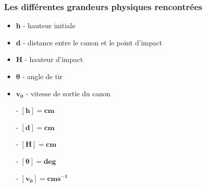 \documentclass[12pt,a4paper]{article}
\begin{document}
    \subsubsection{Les différentes grandeurs physiques rencontrées}
    \begin{minipage}{0.6\linewidth}
        \begin{itemize}
            \item \textbf{h} - hauteur initiale 
            \item \textbf{d} - distance entre le canon et le point d'impact 
            \item \textbf{H} - hauteur d'impact
            \item $\bm{\theta}$ - angle de tir 
            \item $\bm{v_0}$ - vitesse de sortie du canon
        \end{itemize}
    \end{minipage}%
    \hfill
    \begin{minipage}{0.4\linewidth}
        \begin{itemize}
            \item[-] $\bm{[h]=cm}$
            \item[-] $\bm{[d]=cm}$
            \item[-] $\bm{[H]=cm}$
            \item[-] $\bm{[\theta]=deg}$
            \item[-] $\bm{[v_0]=cms^{-1}}$
        \end{itemize}   
    \end{minipage}
\end{document}
